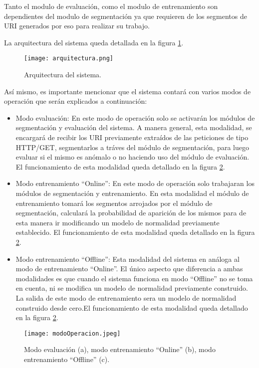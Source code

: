 Tanto el modulo de evaluación, como el modulo de entrenamiento son dependientes del modulo de segmentación ya que requieren de los segmentos de URI generados por eso para realizar su trabajo. 

La arquitectura del sistema queda detallada en la figura \ref{fig:arquitectura}.

\begin{figure}[tb]
\begin{center}
\texttt{[image: arquitectura.png]}
\caption{Arquitectura del sistema.}
\label{fig:arquitectura}
\end{center}
\end{figure}


Así mismo, es importante mencionar que el sistema contará con varios modos de operación que serán explicados a continuación:

\begin{itemize}
\item Modo evaluación: En este modo de operación solo se activarán los módulos de segmentación y evaluación del sistema. A manera general, esta modalidad, se encargará de recibir los URI previamente extraídos de las peticiones de tipo HTTP/GET, segmentarlos a tráves del módulo de segmentación, para luego evaluar si el mismo es anómalo o no
haciendo uso del módulo de evaluación. El funcionamiento de esta modalidad queda detallado en la figura \ref{fig:modoSistema}.
\item Modo entrenamiento ``Online'': En este modo de operación solo trabajaran los módulos de segmentación y entrenamiento. En esta modalidad el módulo de entrenamiento tomará los segmentos arrojados por el módulo de segmentación, calculará la probabilidad de aparición de los mismos para de esta manera ir modificando un modelo de normalidad previamente establecido. El funcionamiento de esta modalidad queda
detallado en la figura \ref{fig:modoSistema}.
\item Modo entrenamiento ``Offline'': Esta modalidad del sistema en análoga al modo de entrenamiento ``Online''. El único aspecto que diferencia a ambas modalidades es que cuando el sistema funciona en modo ``Offline'' no se toma en cuenta, ni se modifica un modelo de normalidad previamente construido. La salida de este modo de entrenamiento sera un modelo de normalidad construido desde cero.El funcionamiento de esta modalidad queda detallado en la figura \ref{fig:modoSistema}.
\end{itemize}

\begin{figure}[tb]
\begin{center}
\texttt{[image: modoOperacion.jpeg]}
\caption{Modo evaluación (a), modo entrenamiento ``Online'' (b), modo entrenamiento ``Offline'' (c).}
\label{fig:modoSistema}
\end{center}
\end{figure}


